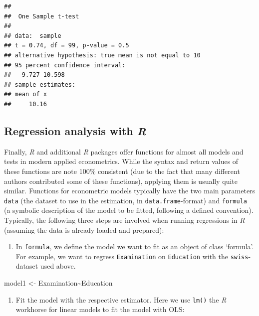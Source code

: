 \documentclass[
  12pt,
]{style/krantz}
\newenvironment{Shaded}{\begin{snugshade}}{\end{snugshade}}
\newcommand{\NormalTok}[1]{#1}
\newcommand{\OtherTok}[1]{\textcolor[rgb]{0.56,0.35,0.01}{#1}}
\newcommand{\SpecialCharTok}[1]{\textcolor[rgb]{0.00,0.00,0.00}{#1}}
\providecommand{\tightlist}{%
  \setlength{\itemsep}{0pt}\setlength{\parskip}{0pt}}
\begin{document}
\begin{verbatim}
## 
##  One Sample t-test
## 
## data:  sample
## t = 0.74, df = 99, p-value = 0.5
## alternative hypothesis: true mean is not equal to 10
## 95 percent confidence interval:
##   9.727 10.598
## sample estimates:
## mean of x 
##     10.16
\end{verbatim}

\hypertarget{regression-analysis-with-r}{%
\subsection{\texorpdfstring{Regression analysis with \emph{R}}{Regression analysis with R}}\label{regression-analysis-with-r}}

Finally, \emph{R} and additional \emph{R} packages offer functions for almost all models and tests in modern applied econometrics. While the syntax and return values of these functions are note 100\% consistent (due to the fact that many different authors contributed some of these functions), applying them is usually quite similar. Functions for econometric models typically have the two main parameters \texttt{data} (the dataset to use in the estimation, in \texttt{data.frame}-format) and \texttt{formula} (a symbolic description of the model to be fitted, following a defined convention). Typically, the following three steps are involved when running regressions in \emph{R} (assuming the data is already loaded and prepared):

\begin{enumerate}
\def\labelenumi{\arabic{enumi}.}
\tightlist
\item
  In \texttt{formula}, we define the model we want to fit as an object of class `formula'. For example, we want to regress \texttt{Examination} on \texttt{Education} with the \texttt{swiss}-dataset used above.
\end{enumerate}

\begin{Shaded}
\begin{Highlighting}[]
\NormalTok{model1 }\OtherTok{\textless{}{-}}\NormalTok{ Examination}\SpecialCharTok{\textasciitilde{}}\NormalTok{Education}
\end{Highlighting}
\end{Shaded}

\begin{enumerate}
\def\labelenumi{\arabic{enumi}.}
\setcounter{enumi}{1}
\tightlist
\item
  Fit the model with the respective estimator. Here we use \texttt{lm()} the \emph{R} workhorse for linear models to fit the model with OLS:
\end{enumerate}
\end{document}

